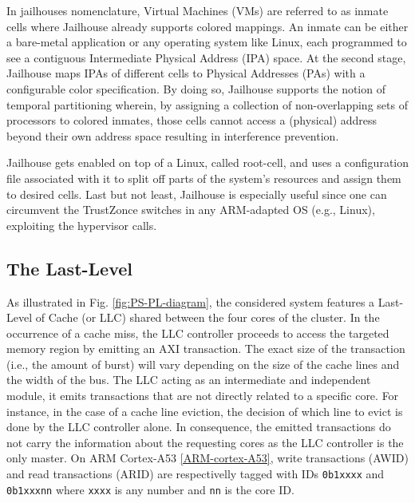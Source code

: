     In jailhouses 
    nomenclature, Virtual Machines (VMs) are referred to as inmate cells where Jailhouse already supports colored mappings. An inmate can be either a bare-metal application or any operating system like Linux, each programmed to see a contiguous Intermediate Physical Address (IPA) space. At the second stage, Jailhouse maps IPAs of different cells to Physical Addresses (PAs) with a configurable color specification. By doing so, Jailhouse supports the notion of temporal partitioning wherein, by assigning a collection of non-overlapping sets of processors to colored inmates, those cells cannot access a (physical) address beyond their own address space resulting in interference prevention.

    Jailhouse gets enabled on top of a Linux, called root-cell, and uses a configuration file associated with it to split off parts of the system's resources and assign them to desired cells. Last but not least, Jailhouse is especially useful since one can circumvent the TrustZonce switches in any ARM-adapted OS (e.g., Linux), exploiting the hypervisor calls.


  \subsection{The Last-Level}
      As illustrated in Fig. \ref{fig:PS-PL-diagram}, the considered system features a Last-Level of Cache (or LLC) shared between the four cores of the cluster. In the occurrence of a cache miss, the LLC controller proceeds to access the targeted memory region by emitting an AXI transaction. The exact size of the transaction (i.e., the amount of burst) will vary depending on the size of the cache lines and the width of the bus. The LLC acting as an intermediate and independent module, it emits transactions that are not directly related to a specific core. For instance, in the case of a cache line eviction, the decision of which line to evict is done by the LLC controller alone. In consequence, the emitted transactions do not carry the information about the requesting cores as the LLC controller is the only master. On ARM Cortex-A53 \ref{ARM-cortex-A53}, write transactions (AWID) and read transactions (ARID) are respectivelly tagged with IDs  \verb|0b1xxxx| and \verb|0b1xxxnn| where \verb|xxxx| is any number and \verb|nn| is the core ID.

